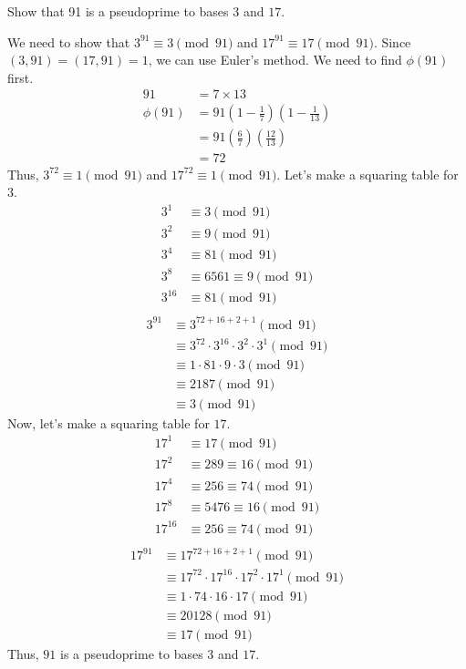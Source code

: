 \documentclass{article}
\begin{document}
\begin{problem}{}{}
    Show that 91 is a pseudoprime to bases $3$ and $17$.
\end{problem}
\begin{solution}{}{}
    We need to show that $3^{91}\equiv3\pmod{91}$ and $17^{91}\equiv17\pmod{91}$. Since $(3, 91)=(17, 91)=1$, we can use Euler's method. We need to find $\phi(91)$ first.
    \begin{align*}
        91 &= 7\times13 \\
        \phi(91) &= 91\left(1-\frac{1}{7}\right)\left(1-\frac{1}{13}\right) \\
        &= 91\left(\frac{6}{7}\right)\left(\frac{12}{13}\right) \\
        &= 72
    \end{align*}
    Thus, $3^{72}\equiv1\pmod{91}$ and $17^{72}\equiv1\pmod{91}$. Let's make a squaring table for $3$.
    \begin{align*}
        3^1 &\equiv 3\pmod{91} \\
        3^2 &\equiv 9\pmod{91} \\
        3^4 &\equiv 81\pmod{91} \\
        3^8 &\equiv 6561\equiv9\pmod{91} \\
        3^{16} &\equiv 81\pmod{91} \\
    \end{align*}
    \begin{align*}
        3^{91}&\equiv 3^{72+16+2+1}\pmod{91} \\
        &\equiv 3^{72}\cdot3^{16}\cdot3^2\cdot3^1\pmod{91} \\
        &\equiv 1\cdot81\cdot9\cdot3\pmod{91} \\
        &\equiv 2187\pmod{91} \\
        &\equiv 3\pmod{91}
    \end{align*}
    Now, let's make a squaring table for $17$.
    \begin{align*}
        17^1 &\equiv 17\pmod{91} \\
        17^2 &\equiv 289\equiv16\pmod{91} \\
        17^4 &\equiv 256\equiv74\pmod{91} \\
        17^8 &\equiv 5476\equiv16\pmod{91} \\
        17^{16} &\equiv 256\equiv74\pmod{91} \\
    \end{align*}
    \begin{align*}
        17^{91}&\equiv 17^{72+16+2+1}\pmod{91} \\
        &\equiv 17^{72}\cdot17^{16}\cdot17^2\cdot17^1\pmod{91} \\
        &\equiv 1\cdot74\cdot16\cdot17\pmod{91} \\
        &\equiv 20128\pmod{91} \\
        &\equiv 17\pmod{91}
    \end{align*}
    Thus, $91$ is a pseudoprime to bases $3$ and $17$.
\end{solution}
\end{document}
